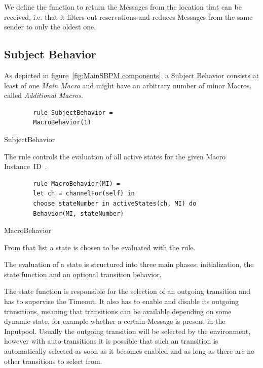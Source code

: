 We define the function  to return the Messages from the location  that can be received, i.e. that it filters out reservations and reduces Messages from the same sender to only the oldest one.

\subsection{Subject Behavior}

As depicted in figure~\ref{fig:MainSBPM components}, a Subject Behavior consists at least of one \textit{Main Macro} and might have an arbitrary number of minor Macros, called \textit{Additional Macros}.

\begin{listing}[H]
	\begin{verbatim}
		rule SubjectBehavior =
		MacroBehavior(1)
	\end{verbatim}
	\caption{SubjectBehavior}
	\label{lst:shortasm:SubjectBehavior}
\end{listing}



The  rule controls the evaluation of all active
states for the given Macro Instance~ID~.

\begin{listing}[H]
	\begin{verbatim}
		rule MacroBehavior(MI) =
		let ch = channelFor(self) in
		choose stateNumber in activeStates(ch, MI) do
		Behavior(MI, stateNumber)
	\end{verbatim}
	\caption{MacroBehavior}
	\label{lst:shortasm:MacroBehavior}
\end{listing}

From that list a state  is chosen to be evaluated with the  rule.


The evaluation of a state is structured into three main phases: initialization,
the state function and an optional transition behavior.

The state function is responsible for the selection of an outgoing transition and
has to supervise the Timeout. It also has to enable and disable its outgoing
transitions, meaning that transitions can be available depending on some dynamic state,
for example whether a certain Message is present in the Inputpool.
Usually the outgoing transition will be selected by the environment, however with
auto-transitions it is possible that such an transition is automatically selected as soon
as it becomes enabled and as long as there are no other transitions to select from.

